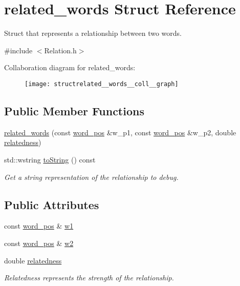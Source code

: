 \hypertarget{structrelated__words}{}\section{related\+\_\+words Struct Reference}
\label{structrelated__words}


Struct that represents a relationship between two words.  




{\ttfamily \#include $<$Relation.\+h$>$}



Collaboration diagram for related\+\_\+words\+:
\nopagebreak
\begin{figure}[H]
\begin{center}
\leavevmode
\texttt{[image: structrelated\_\_words\_\_coll\_\_graph]}
\end{center}
\end{figure}
\subsection*{Public Member Functions}
\begin{DoxyCompactItemize}
\item 
\hyperlink{structrelated__words_a0f35724f6fcc5cad5666b7b32c3cd36f}{related\+\_\+words} (const \hyperlink{structword__pos}{word\+\_\+pos} \&w\+\_\+p1, const \hyperlink{structword__pos}{word\+\_\+pos} \&w\+\_\+p2, double \hyperlink{structrelated__words_aefbff0c852fe59008f43f2c921b42330}{relatedness})
\item 
std\+::wstring \hyperlink{structrelated__words_a4feeb3a32b398b9b1f31197431bd0002}{to\+String} () const 
\begin{DoxyCompactList}\small\item\em Get a string representation of the relationship to debug. \end{DoxyCompactList}\end{DoxyCompactItemize}
\subsection*{Public Attributes}
\begin{DoxyCompactItemize}
\item 
const \hyperlink{structword__pos}{word\+\_\+pos} \& \hyperlink{structrelated__words_a442442bc95c4964a943f0d60c3a0eb30}{w1}
\item 
const \hyperlink{structword__pos}{word\+\_\+pos} \& \hyperlink{structrelated__words_a183d95179fe2892922bcd9485b48989f}{w2}
\item 
double \hyperlink{structrelated__words_aefbff0c852fe59008f43f2c921b42330}{relatedness}
\begin{DoxyCompactList}\small\item\em Relatedness represents the strength of the relationship. \end{DoxyCompactList}\end{DoxyCompactItemize}


